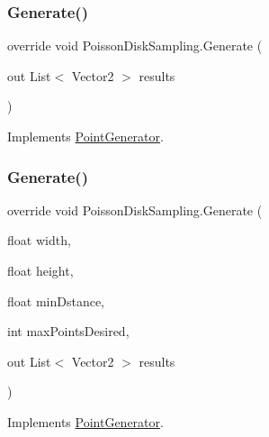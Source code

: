 \subsubsection{\texorpdfstring{Generate()}{Generate()}\hspace{0.1cm}{\footnotesize\ttfamily [1/2]}}
{\footnotesize\ttfamily override void Poisson\+Disk\+Sampling.\+Generate (\begin{DoxyParamCaption}\item[{out List$<$ Vector2 $>$}]{results }\end{DoxyParamCaption})\hspace{0.3cm}{\ttfamily [virtual]}}



Implements \mbox{\hyperlink{class_point_generator_aa952bfb78a0b3d97db614f9f8d062747}{Point\+Generator}}.

\mbox{\label{class_poisson_disk_sampling_af2aeccc94efa7d224044f730fc432bcf}} 
\subsubsection{\texorpdfstring{Generate()}{Generate()}\hspace{0.1cm}{\footnotesize\ttfamily [2/2]}}
{\footnotesize\ttfamily override void Poisson\+Disk\+Sampling.\+Generate (\begin{DoxyParamCaption}\item[{float}]{width,  }\item[{float}]{height,  }\item[{float}]{min\+Dstance,  }\item[{int}]{max\+Points\+Desired,  }\item[{out List$<$ Vector2 $>$}]{results }\end{DoxyParamCaption})\hspace{0.3cm}{\ttfamily [virtual]}}



Implements \mbox{\hyperlink{class_point_generator_a9552a67546e0f4a0d96cd300c656c94e}{Point\+Generator}}.

\mbox{\label{class_poisson_disk_sampling_a96daccb88a2edb1f835d3ed8e19ace2e}} 
